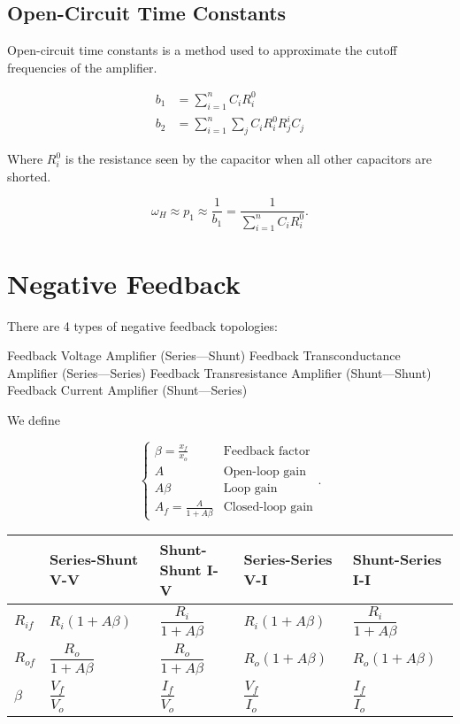 \documentclass{report}
\begin{document}
\section{Open-Circuit Time Constants}

Open-circuit time constants is a method used to approximate the cutoff frequencies of the amplifier.

\begin{align*}
	b_1 & = \sum_{i=1}^n C_i R_i^0                  \\
	b_2 & = \sum_{i=1}^n \sum_j C_i R_i^0 R_j^i C_j
\end{align*}

Where $R_i^0$ is the resistance seen by the capacitor when all other capacitors are shorted.

\[
	\omega_H \approx p_1 \approx \frac{1}{b_1} = \frac{1}{\sum_{i=1}^n C_i R_i^0}
	.\]

\chapter{Negative Feedback}

There are 4 types of negative feedback topologies:

\begin{enumerate}
	\ii Feedback Voltage Amplifier (Series—Shunt)
	\ii Feedback Transconductance Amplifier (Series—Series)
	\ii Feedback Transresistance Amplifier (Shunt—Shunt)
	\ii Feedback Current Amplifier (Shunt—Series)
\end{enumerate}

We define

\[
	\begin{cases} \displaystyle
		\beta = \frac{x_f}{x_o}    & \text{Feedback factor}  \\
		A                          & \text{Open-loop gain}   \\
		A \beta                    & \text{Loop gain}        \\
		\displaystyle
		A_f = \frac{A}{1 + A\beta} & \text{Closed-loop gain}
	\end{cases}
	.\]

\begin{table}[H]
	\centering
	\def\arraystretch{2.5}
	\begin{tabular}[c]{|l|l|l|l|l|}
		\hline
		         & Series-Shunt V-V        & Shunt-Shunt I-V         & Series-Series V-I  & Shunt-Series I-I        \\
		\hline
		$R_{if}$ & $R_i (1+A\beta)$        & $\dfrac{R_i}{1+A\beta}$ & $R_i (1+A\beta)$   & $\dfrac{R_i}{1+A\beta}$ \\
		$R_{of}$ & $\dfrac{R_o}{1+A\beta}$ & $\dfrac{R_o}{1+A\beta}$ & $R_o (1+A\beta)$   & $R_o (1+A\beta)$        \\
		$\beta$  & $\dfrac{V_f}{V_o}$      & $\dfrac{I_f}{V_o}$      & $\dfrac{V_f}{I_o}$ & $\dfrac{I_f}{I_o}$      \\
		\hline
	\end{tabular}
\end{table}
\end{document}
